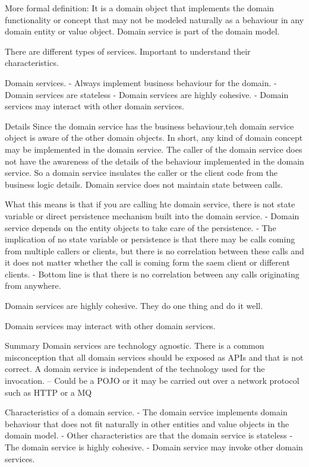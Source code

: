 \documentclass[a4paper, 11pt]{book}
\begin{document}
    More formal definition:
    It is a domain object that implements the domain functionality or concept that may not be modeled naturally as a behaviour in any domain entity or value object.
    Domain service is part of the domain model.

    There are different types of services. Important to understand their characteristics.

    Domain services.
    - Always implement business behaviour for the domain.
    - Domain services are stateless
    - Domain services are highly cohesive.
    - Domain services may interact with other domain services.

    Details
    Since the domain service has the business behaviour,teh domain service object is aware of the other domain objects.
    In short, any kind of domain concept may be implemented in the domain service.
    The caller of the domain service does not have the awareness of the details of the behaviour implemented in the domain service.
    So a domain service insulates the caller or the client code from the business logic details.
    Domain service does not maintain state between calls.

    What this means is that if you are calling hte domain service, there is not state variable or direct persistence mechanism built into the domain service.
    - Domain service depends on the entity objects to take care of the persistence.
    - The implication of no state variable or persistence is that there may be calls coming from multiple callers or clients, but there is no correlation between these calls and it does not matter whether the call is coming form the saem client or different clients.
    - Bottom line is that there is no correlation between any calls originating from anywhere.

    Domain services are highly cohesive.
    They do one thing and do it well.

    Domain services may interact with other domain services.

    Summary
    Domain services are technology agnostic.
    There is a common misconception that all domain services should be exposed as APIs and that is not correct.
    A domain service is independent of the technology used for the invocation.
    -- Could be a POJO or it may be carried out over a network protocol such as HTTP or a MQ

    Characteristics of a domain service.
    - The domain service implements domain behaviour that does not fit naturally in other entities and value objects in the domain model.
    - Other characteristics are that the domain service is stateless
    - The domain service is highly cohesive.
    - Domain service may invoke other domain services.
\end{document}
